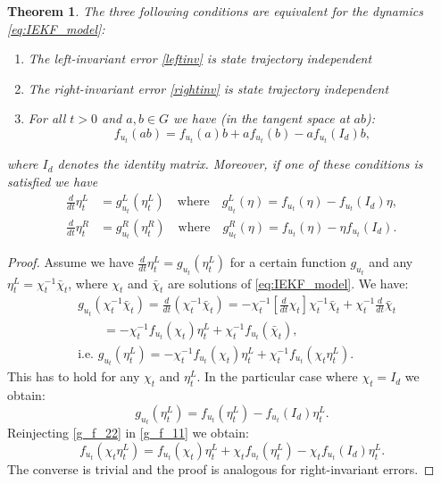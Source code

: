 \documentclass[a4paper,12pt,onecolumn]{article}
\newtheorem{thm}{Theorem}
\begin{document}
\begin{thm}
\label{thm::CNS}
 The three following conditions are equivalent for the dynamics \eqref{eq:IEKF_model}:
\begin{enumerate}[i]
\item The left-invariant error \eqref{leftinv} is state trajectory independent
\item The right-invariant error \eqref{rightinv} is state trajectory independent
\item For all $t>0$ and $a,b \in G$ we have (in the tangent space at $ab$):
\begin{equation}
\label{eq::main_relation}
f_{u_t}(ab) = f_{u_t}(a)b + af_{u_t}(b) - a f_{u_t}(I_d)b,
\end{equation}
\end{enumerate}
where $I_d$ denotes the identity matrix. Moreover, if one of these conditions is satisfied we have 
\begin{align}\frac{d}{dt}\eta_t^L &= g_{u_t}^L(\eta_t^L)\quad\text{where}\quad g_{u_t}^L(\eta)=f_{u_t}(\eta)-f_{u_t}(I_d)\eta \label{g_f_1},\\\frac{d}{dt}\eta_t^R &= g_{u_t}^R(\eta_t^R)\quad\text{where}\quad
g_{u_t}^R(\eta)=f_{u_t}(\eta)-\eta f_{u_t}(I_d). \label{g_f_2}\end{align}
\end{thm}

\begin{proof}
Assume we have $\frac{d}{dt}\eta_t^L = g_{u_t}(\eta_t^L)$ for a certain function $g_{u_t}$ and any  $\eta_t^L = \chi_t^{-1} \bar{\chi}_t$, where $\chi_t$ and $\bar{\chi}_t$ are solutions of \eqref{eq:IEKF_model}. We have:
\begin{align}
&g_{u_t}(\chi_t^{-1} \bar{\chi}_t)  = \frac{d}{dt} (\chi_t^{-1} \bar{\chi}_t) = -\chi_t^{-1} [\frac{d}{dt} \chi_t] \chi_t^{-1} \bar{\chi}_t + \chi_t^{-1} \frac{d}{dt}\bar{\chi}_t \nonumber\\&\qquad = -\chi_t^{-1} f_{u_t}(\chi_t)  \eta_t^L + \chi_t^{-1}f_{u_t}(\bar{\chi}_t), \nonumber \\
&\text{i.e. } g_{u_t}(\eta_t^L)  = -\chi_t^{-1} f_{u_t}(\chi_t) \eta_t^L + \chi_t^{-1} f_{u_t}(\chi_t \eta_t^L) \label{g_f_11}.
\end{align}
This has to hold for any $\chi_t$ and $\eta_t^L$. In the particular case where $\chi_t = I_d$ we obtain:
\begin{equation}
g_{u_t}(\eta_t^L)=f_{u_t}(\eta_t^L)-f_{u_t}(I_d)\eta_t^L . \label{g_f_22}
\end{equation}
Reinjecting \eqref{g_f_22} in \eqref{g_f_11} we obtain:
\[
f_{u_t}(\chi_t \eta_t^L) = f_{u_t}(\chi_t)\eta_t^L + \chi_tf_{u_t}(\eta_t^L) - \chi_t f_{u_t}(I_d) \eta_t^L.
\]
The converse is trivial and the proof is analogous for right-invariant errors.
\end{proof}
\end{document}
